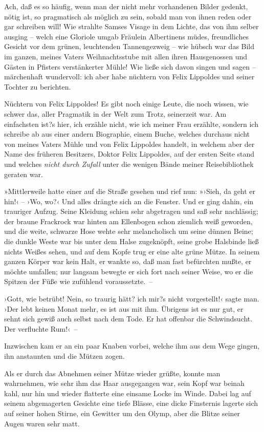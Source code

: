 Ach, daß es so häufig, wenn man der nicht mehr vorhandenen Bilder
gedenkt, nötig ist, so pragmatisch als möglich zu sein, sobald man
von ihnen reden oder gar schreiben will! Wie strahlte Samses Visage
in dem Lichte, das von ihm selber ausging – welch eine Gloriole
umgab Fräulein Albertinens müdes, freundliches Gesicht vor dem
grünen, leuchtenden Tannengezweig – wie hübsch war das Bild im
ganzen, meines Vaters Weihnachtsstube mit allen ihren Hausgenossen
und Gästen in Pfisters verstänkerter Mühle! Wie ließe sich davon
singen und sagen – märchenhaft wundervoll: ich aber habe nüchtern
von Felix Lippoldes und seiner Tochter zu berichten.

Nüchtern von Felix Lippoldes! Es gibt noch einige Leute, die noch
wissen, wie schwer das, aller Pragmatik in der Welt zum Trotz,
seinerzeit war. Am einfachsten ist?s hier, ich erzähle nicht, wie
ich meiner Frau erzählte, sondern ich schreibe ab aus einer andern
Biographie, einem Buche, welches durchaus nicht von meines Vaters
Mühle und von Felix Lippoldes handelt, in welchem aber der Name des
früheren Besitzers, Doktor Felix Lippoldes, auf der ersten Seite
stand und welches \emph{nicht durch Zufall} unter die wenigen Bände
meiner Reisebibliothek geraten war.

»Mittlerweile hatte einer auf die Straße gesehen und rief nun:
»›Sieh, da geht er hin!‹ – ›Wo, wo?‹ Und alles drängte sich an die
Fenster. Und er ging dahin, ein trauriger Aufzug. Seine Kleidung
schien sehr abgetragen und saß sehr nachlässig; der braune
Frackrock war hinten am Ellenbogen schon ziemlich weiß geworden,
und die weite, schwarze Hose wehte sehr melancholisch um seine
dünnen Beine; die dunkle Weste war bis unter dem Halse zugeknöpft,
seine grobe Halsbinde ließ nichts Weißes sehen, und auf dem Kopfe
trug er eine alte grüne Mütze. In seinem ganzen Körper war kein
Halt, er wankte so, daß man fast befürchten mußte, er möchte
umfallen; nur langsam bewegte er sich fort nach seiner Weise, wo er
die Spitzen der Füße wie zufühlend voraussetzte.~–

›Gott, wie betrübt! Nein, so traurig hätt? ich mir?s nicht
vorgestellt!‹ sagte man. ›Der lebt keinen Monat mehr, es ist aus
mit ihm. Übrigens ist es nur gut, er sehnt sich gewiß auch selbst
nach dem Tode. Er hat offenbar die Schwindsucht. Der verfluchte
Rum!‹~–

Inzwischen kam er an ein paar Knaben vorbei, welche ihm aus dem
Wege gingen, ihn anstaunten und die Mützen zogen.

Als er durch das Abnehmen seiner Mütze wieder grüßte, konnte man
wahrnehmen, wie sehr ihm das Haar ausgegangen war, sein Kopf war
beinah kahl, nur hin und wieder flatterte eine einsame Locke im
Winde. Dabei lag auf seinem abgemagerten Gesichte eine tiefe
Blässe, eine dicke Finsternis lagerte sich auf seiner hohen Stirne,
ein Gewitter um den Olymp, aber die Blitze seiner Augen waren sehr
matt.

